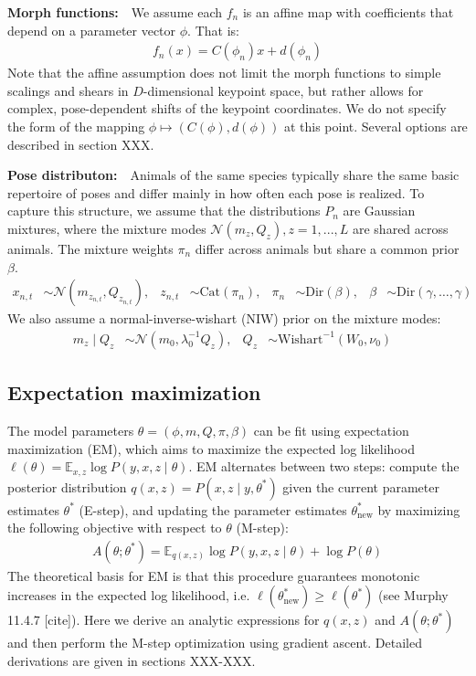 \documentclass{article}         %
\newcommand{\EE}{\mathbb{E}}
\newcommand{\NN}{\mathcal{N}}
\begin{document}
\textbf{Morph functions:}\ \ We assume each $f_n$ is an affine map with coefficients that depend on a parameter vector $\phi$. That is:
\begin{align}
    f_n(x) = C(\phi_n) x + d(\phi_n) 
\end{align}
Note that the affine assumption does not limit the morph functions to simple scalings and shears in $D$-dimensional keypoint space, but rather allows for complex, pose-dependent shifts of the keypoint coordinates. We do not specify the form of the mapping $\phi \mapsto (C(\phi), d(\phi))$ at this point. Several options are described in section XXX.

\textbf{Pose distributon:}\ \ Animals of the same species typically share the same basic repertoire of poses and differ mainly in how often each pose is realized. To capture this structure, we assume that the distributions $P_n$ are Gaussian mixtures, where the mixture modes $\NN(m_z, Q_z), z=1,...,L$ are shared across animals. The mixture weights $\pi_n$ differ across animals but share a common prior $\beta$. 
\begin{align*}
    x_{n,t} & \sim \NN(m_{z_{n,t}}, Q_{z_{n,t}}), &
    z_{n,t} & \sim \text{Cat}(\pi_n), &
    \pi_n & \sim \text{Dir}(\beta), &
    \beta & \sim \text{Dir}(\gamma,\dots,\gamma)
\end{align*}
We also assume a normal-inverse-wishart (NIW) prior on the mixture modes:
\begin{align*}
    m_z \mid Q_z & \sim \NN(m_0, \lambda_0^{-1} Q_z), &
    Q_z & \sim \text{Wishart}^{-1}(W_0, \nu_0) &
\end{align*}

\subsection{Expectation maximization}
\label{sec:em-general}

The model parameters $\theta = (\phi, m, Q, \pi, \beta)$ can be fit using expectation maximization (EM), which aims to maximize the expected log likelihood $\ell(\theta) = \EE_{x,z} \log P(y, x, z \mid \theta)$. EM alternates between two steps: compute the posterior distribution $q(x, z) = P(x, z \mid y, \theta^*)$ given the current parameter estimates $\theta^*$ (E-step), and updating the parameter estimates $\theta^*_\text{new}$ by maximizing the following objective with respect to $\theta$ (M-step):
\begin{align}
    A(\theta; \theta^*) = \EE_{q(x,z)} \log P(y, x, z \mid \theta) + \log P(\theta)
    \label{eq:A-defn}
\end{align}
The theoretical basis for EM is that this procedure guarantees monotonic increases in the expected log likelihood, i.e. $\ell(\theta^*_{\text{new}}) \geq \ell(\theta^*)$ (see Murphy 11.4.7 [cite]). Here we derive an analytic expressions for $q(x, z)$ and $A(\theta; \theta^*)$ and then perform the M-step optimization using gradient ascent. Detailed derivations are given in sections XXX-XXX.
\end{document}
